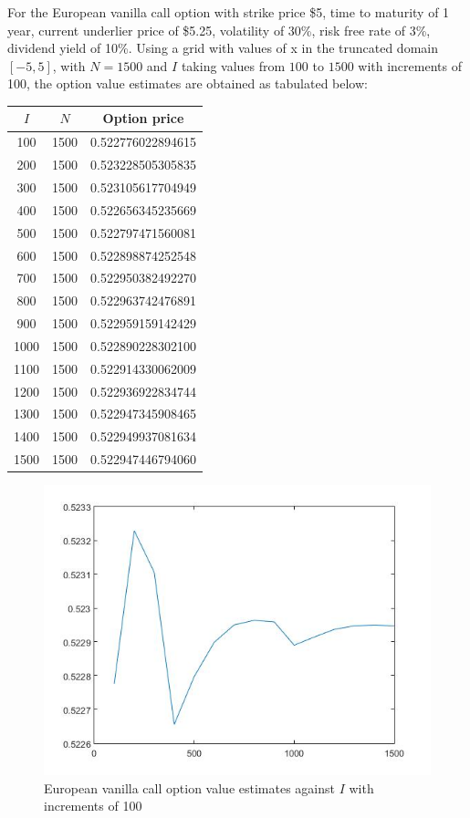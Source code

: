 For the European vanilla call option with strike price \$5, time to maturity of 1 year, current underlier price of \$5.25, volatility of 30\%, risk free rate of 3\%, dividend yield of 10\%. Using a grid with values of x in the truncated domain $[-5, 5]$, with $N = 1500$ and $I$ taking values from $100$ to $1500$ with increments of 100, the option value estimates are obtained as tabulated below:
\begin{center}
	\begin{tabular}{| c | c | c |}
		\hline $I$ & $N$ & Option price\\
		[0.5ex]
		\hline 100 & 1500 & 0.522776022894615  \\
		\hline 200 & 1500 & 0.523228505305835  \\
		\hline 300 & 1500 & 0.523105617704949  \\
		\hline 400 & 1500 & 0.522656345235669  \\
		\hline 500 & 1500 & 0.522797471560081  \\
		\hline 600 & 1500 & 0.522898874252548  \\
		\hline 700 & 1500 & 0.522950382492270  \\
		\hline 800 & 1500 & 0.522963742476891  \\
		\hline 900 & 1500 & 0.522959159142429  \\
		\hline 1000 & 1500 & 0.522890228302100 \\
		\hline 1100 & 1500 & 0.522914330062009 \\
		\hline 1200 & 1500 & 0.522936922834744 \\
		\hline 1300 & 1500 & 0.522947345908465 \\
		\hline 1400 & 1500 & 0.522949937081634 \\
		\hline 1500 & 1500 & 0.522947446794060 \\
		\hline
	\end{tabular}
\end{center}

\begin{figure}[htbp!]
	\centering
	\includegraphics[scale=0.7]{smallPlot.jpg}
	\caption{European vanilla call option value estimates against $I$ with increments of 100}
\end{figure}

